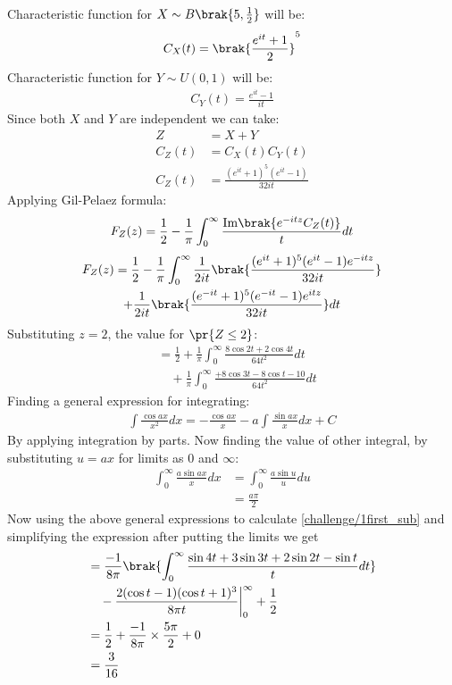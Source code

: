 Characteristic function for $X \sim B\brak{5,\frac{1}{2}}$ will be:
\begin{align}
    C_X(t)=\brak{\frac{e^{it}+1}{2}}^5
\end{align}
Characteristic function for $Y \sim U(0,1)$ will be:
\begin{align}
    C_Y(t)=\frac{e^{it}-1}{it}
\end{align}
Since both $X$ and $Y$ are independent we can take:
\begin{align}
    Z&=X+Y\\
    C_Z(t)&=C_X(t)C_Y(t)\\
    C_Z(t)&= \frac{(e^{it}+1)^5(e^{it}-1)}{32it}
\end{align}
Applying Gil-Pelaez formula:
\begin{align}
    F_Z(z)=\frac{1}{2}-\frac{1}{\pi}\int_0^\infty \frac{\text{Im}\brak{e^{-itz}C_Z(t)}}{t}dt
\end{align}
\begin{multline*}
    F_Z(z)=\frac{1}{2}-\frac{1}{\pi}\int_0^\infty\frac{1}{2it}\brak{\frac{(e^{it}+1)^5(e^{it}-1)e^{-itz}}{32it}}\\+\frac{1}{2it}\brak{\frac{(e^{-it}+1)^5(e^{-it}-1)e^{itz}}{32it}}dt
\end{multline*}
Substituting $z=2$, the value for $\pr{Z\leq 2}$:
\begin{align}
\nonumber
    &=\frac{1}{2}+\frac{1}{\pi}\int_0^\infty \frac{8\cos{2t}+2\cos{4t}}{64t^2}dt\\
    &\quad+\frac{1}{\pi}\int_0^\infty\frac{+8\cos{3t}-8\cos{t}-10}{64t^2}dt\label{challenge/1first_sub}
\end{align}
Finding a general expression for integrating:
\begin{align}
    \int \frac{\cos{ax}}{x^2}dx=-\frac{\cos{ax}}{x}-a\int\frac{\sin{ax}}{x}dx + C\label{challenge/1gen1}
\end{align}
By applying integration by parts. Now finding the value of other integral, by substituting $u=ax$ for limits as $0$ and $\infty$:
\begin{align}
    \int_0^\infty\frac{a\sin{ax}}{x}dx &= \int_0^\infty\frac{a\sin{u}}{u}du\\
    &=\frac{a\pi}{2}\label{challenge/1gen2}
\end{align}
Now using the above general expressions to calculate \eqref{challenge/1first_sub} and simplifying the expression after putting the limits we get
\begin{align}
    &=\frac{-1}{8\pi}\brak{\int_0^\infty\frac{\sin{4t}+3\sin{3t}+2\sin{2t}-\sin{t}}{t}dt}\\
    &\quad -\frac{2(\cos{t}-1)(\cos{t}+1)^3}{8\pi t}\bigg|_0^\infty+\frac{1}{2}\\
    &=\frac{1}{2} + \frac{-1}{8\pi}\times \frac{5\pi}{2}+0\\
    &=\frac{3}{16}\label{challenge/1first_value}
\end{align}
